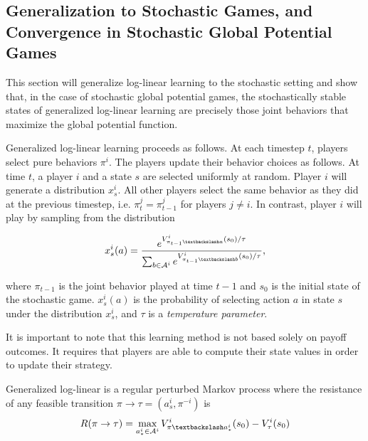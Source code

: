 \subsection{Generalization to Stochastic Games, and Convergence in Stochastic Global Potential Games}

This section will generalize log-linear learning to the stochastic setting and show that, in the case of stochastic global potential games, the stochastically stable states of generalized log-linear learning are precisely those joint behaviors that maximize the global potential function. 

Generalized log-linear learning proceeds as follows. At each timestep $t$, players select pure behaviors $\pi^i$. The players update their behavior choices as follows. At time $t$, a player $i$ and a state $s$ are selected uniformly at random. Player $i$ will generate a distribution $x^i_s$. All other players select the same behavior as they did at the previous timestep, i.e. $\pi_t^j = \pi_{t-1}^j$ for players $j \neq i$. In contrast, player $i$ will play by sampling from the distribution

$$
x^i_s(a) = \dfrac{e^{V^i_{\asub{\pi_{t-1}}{a}}(s_0)/\tau}}{\sum_{b \in \AA^i} e^{V^i_{\asub{\pi_{t-1}}{b}}(s_0)/\tau} },
$$

\noindent where $\pi_{t-1}$ is the joint behavior played at time $t-1$ and $s_0$ is the initial state of the stochastic game. $x^i_s(a)$ is the probability of selecting action $a$ in state $s$ under the distribution $x^i_s$, and $\tau$ is a {\em temperature parameter}. 

It is important to note that this learning method is not based solely on payoff outcomes. It requires that players are able to compute their state values in order to update their strategy.


\begin{lem}
Generalized log-linear is a regular perturbed Markov process where the resistance of any feasible transition $\pi \rightarrow \tau = (a^i_s, \pi^{-i})$ is
$$
R(\pi \rightarrow \tau) = \max_{a^i_* \in \AA^i} V^i_{\asub{\pi}{a^i_*}}(s_0) - V^i_{\tau}(s_0)
$$
\end{lem}

